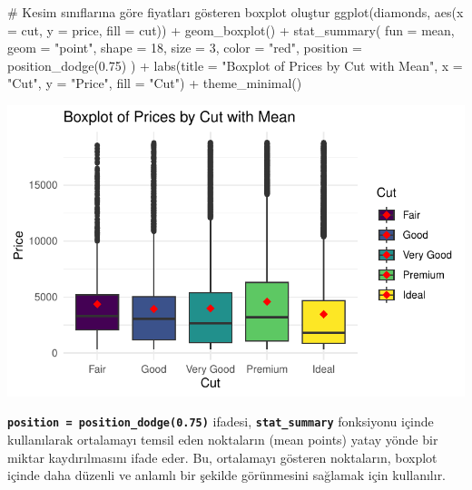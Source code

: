 \documentclass[
  letterpaper,
  DIV=11,
  numbers=noendperiod]{scrreprt}
\newenvironment{Shaded}{\begin{snugshade}}{\end{snugshade}}
\newcommand{\AttributeTok}[1]{\textcolor[rgb]{0.40,0.45,0.13}{#1}}
\newcommand{\CommentTok}[1]{\textcolor[rgb]{0.37,0.37,0.37}{#1}}
\newcommand{\DecValTok}[1]{\textcolor[rgb]{0.68,0.00,0.00}{#1}}
\newcommand{\FloatTok}[1]{\textcolor[rgb]{0.68,0.00,0.00}{#1}}
\newcommand{\FunctionTok}[1]{\textcolor[rgb]{0.28,0.35,0.67}{#1}}
\newcommand{\NormalTok}[1]{\textcolor[rgb]{0.00,0.23,0.31}{#1}}
\newcommand{\SpecialCharTok}[1]{\textcolor[rgb]{0.37,0.37,0.37}{#1}}
\newcommand{\StringTok}[1]{\textcolor[rgb]{0.13,0.47,0.30}{#1}}
\begin{document}
\begin{Shaded}
\begin{Highlighting}[]
\CommentTok{\# Kesim sınıflarına göre fiyatları gösteren boxplot oluştur}
\FunctionTok{ggplot}\NormalTok{(diamonds, }\FunctionTok{aes}\NormalTok{(}\AttributeTok{x =}\NormalTok{ cut, }\AttributeTok{y =}\NormalTok{ price, }\AttributeTok{fill =}\NormalTok{ cut)) }\SpecialCharTok{+}
  \FunctionTok{geom\_boxplot}\NormalTok{() }\SpecialCharTok{+}
  \FunctionTok{stat\_summary}\NormalTok{(}
    \AttributeTok{fun =}\NormalTok{ mean,}
    \AttributeTok{geom =} \StringTok{"point"}\NormalTok{,}
    \AttributeTok{shape =} \DecValTok{18}\NormalTok{,}
    \AttributeTok{size =} \DecValTok{3}\NormalTok{,}
    \AttributeTok{color =} \StringTok{"red"}\NormalTok{,}
    \AttributeTok{position =} \FunctionTok{position\_dodge}\NormalTok{(}\FloatTok{0.75}\NormalTok{)}
\NormalTok{  ) }\SpecialCharTok{+}
  \FunctionTok{labs}\NormalTok{(}\AttributeTok{title =} \StringTok{"Boxplot of Prices by Cut with Mean"}\NormalTok{,}
       \AttributeTok{x =} \StringTok{"Cut"}\NormalTok{,}
       \AttributeTok{y =} \StringTok{"Price"}\NormalTok{,}
       \AttributeTok{fill =} \StringTok{"Cut"}\NormalTok{) }\SpecialCharTok{+}
  \FunctionTok{theme\_minimal}\NormalTok{()}
\end{Highlighting}
\end{Shaded}

\includegraphics{ggplot2_files/figure-pdf/unnamed-chunk-8-1.pdf}

\textbf{\texttt{position\ =\ position\_dodge(0.75)}} ifadesi,
\textbf{\texttt{stat\_summary}} fonksiyonu içinde kullanılarak
ortalamayı temsil eden noktaların (mean points) yatay yönde bir miktar
kaydırılmasını ifade eder. Bu, ortalamayı gösteren noktaların, boxplot
içinde daha düzenli ve anlamlı bir şekilde görünmesini sağlamak için
kullanılır.
\end{document}
